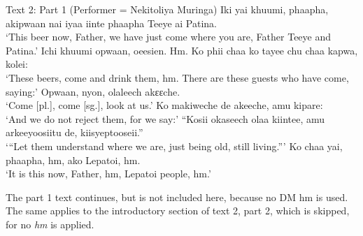 \documentclass[output=paper,colorlinks,citecolor=brown]{langscibook}
\begin{document}


\ea Text 2: Part 1 (Performer = Nekitoliya Muringa)
        \ea    Iki yai khuumi, phaapha, akipwaan nai iyaa iinte phaapha Teeye ai Patina.\\ 
                `This beer now, Father, we have just come where you are, Father Teeye and Patina.'
        \ex    Ichi khuumi opwaan, oeesien. Hm. Ko phii chaa ko tayee chu chaa kapwa, kolei:\\
                `These beers, come and drink them, hm. There are these guests who have come, saying:'
        \ex    Opwaan, nyon, olaleech akɛɛche.\\
                `Come [pl.], come [sg.], look at us.'
        \ex    Ko makiweche de akeeche, amu kipare:\\
                `And we do not reject them, for we say:'
        \ex    “Kosii okaseech olaa kiintee, amu arkeeyoosiitu de, kiisyeptooseii.”\\
                `“Let them understand where we are, just being old, still living.”'
        \ex    Ko chaa yai, phaapha, hm, ako Lepatoi, hm.\\
                `It is this now, Father, hm, Lepatoi people, hm.'
  \z
\z


The part 1 text continues, but is not included here, because no DM hm is used. The same applies to the introductory section of text 2, part 2, which is skipped, for no \textit{hm} is applied.
\end{document}
